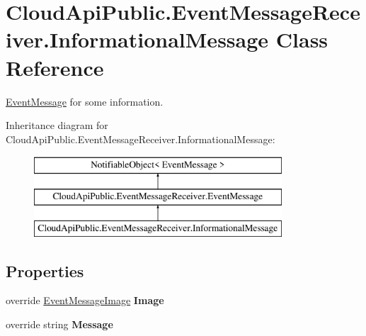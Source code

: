 \hypertarget{class_cloud_api_public_1_1_event_message_receiver_1_1_informational_message}{\section{Cloud\-Api\-Public.\-Event\-Message\-Receiver.\-Informational\-Message Class Reference}
\label{class_cloud_api_public_1_1_event_message_receiver_1_1_informational_message}
}


\hyperlink{class_cloud_api_public_1_1_event_message_receiver_1_1_event_message}{Event\-Message} for some information.  


Inheritance diagram for Cloud\-Api\-Public.\-Event\-Message\-Receiver.\-Informational\-Message\-:\begin{figure}[H]
\begin{center}
\leavevmode
\includegraphics[height=3.000000cm]{class_cloud_api_public_1_1_event_message_receiver_1_1_informational_message}
\end{center}
\end{figure}
\subsection*{Properties}
\begin{DoxyCompactItemize}
\item 
\hypertarget{class_cloud_api_public_1_1_event_message_receiver_1_1_informational_message_a3d8d7d0a448afba7df0ca580c7818a60}{override \hyperlink{namespace_cloud_api_public_1_1_static_aefcc1e7e1c81366ec3f6affd41c1f817}{Event\-Message\-Image} {\bfseries Image}}\label{class_cloud_api_public_1_1_event_message_receiver_1_1_informational_message_a3d8d7d0a448afba7df0ca580c7818a60}

\item 
\hypertarget{class_cloud_api_public_1_1_event_message_receiver_1_1_informational_message_a79d8f94b64b3f26e2cd4385f26751c81}{override string {\bfseries Message}}\label{class_cloud_api_public_1_1_event_message_receiver_1_1_informational_message_a79d8f94b64b3f26e2cd4385f26751c81}

\end{DoxyCompactItemize}
